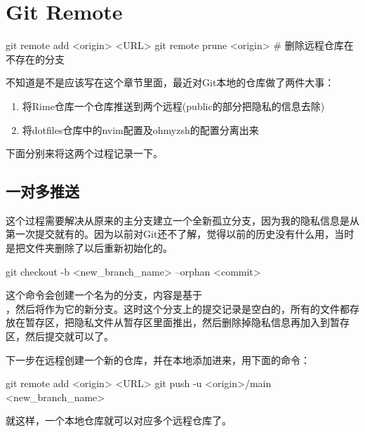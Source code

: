 \section{Git Remote}
\begin{shellcmd}
git remote add <origin> <URL>
git remote prune <origin> # 删除远程仓库在不存在的分支
\end{shellcmd}

不知道是不是应该写在这个章节里面，最近对Git本地的仓库做了两件大事：

\begin{enumerate}
	\item 将Rime仓库一个仓库推送到两个远程(public的部分把隐私的信息去除)
	\item 将dotfiles仓库中的nvim配置及ohmyzsh的配置分离出来
\end{enumerate}

下面分别来将这两个过程记录一下。

\subsection{一对多推送}
这个过程需要解决从原来的主分支建立一个全新孤立分支，因为我的隐私信息是从第一次提交就有的。因为以前对Git还不了解，觉得以前的历史没有什么用，当时是把文件夹删除了以后重新初始化的。
\begin{shellcmd}
	git checkout -b <new_branch_name> --orphan <commit>
\end{shellcmd}
这个命令会创建一个名为的分支，内容是基于\\，然后将作为它的新分支。这时这个分支上的提交记录是空白的，所有的文件都存放在暂存区，把隐私文件从暂存区里面推出，然后删除掉隐私信息再加入到暂存区，然后提交就可以了。

下一步在远程创建一个新的仓库，并在本地添加进来，用下面的命令：
\begin{shellcmd}
git remote add <origin> <URL>
git push -u <origin>/main <new_branch_name>
\end{shellcmd}
就这样，一个本地仓库就可以对应多个远程仓库了。

